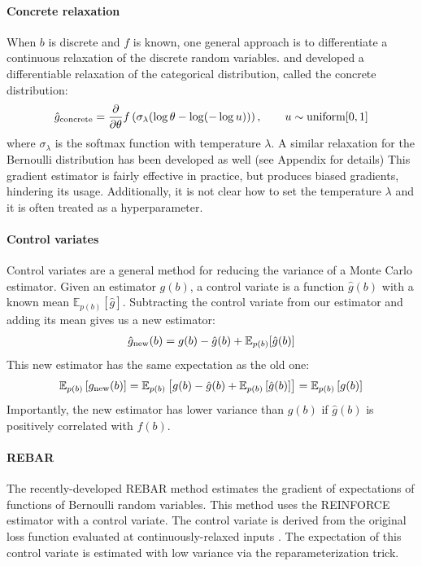 \documentclass{article}
\newcommand{\controlf}{\hat g}  %
\newcommand{\PT}{\frac{\partial}{\partial \theta}}
\begin{document}
\paragraph{Concrete relaxation}
When $b$ is discrete and $f$ is known, one general approach is to differentiate a continuous relaxation of the discrete random variables.
\cite{maddison2016concrete} and \cite{jang2016categorical} developed a differentiable relaxation of the categorical distribution, called the concrete distribution:
%
\begin{align}
\hat g_\textnormal{concrete} = \PT f \left( \sigma_\lambda ( \log \theta - \log(-\log u)) \right), \qquad u \sim \textnormal{uniform}[0, 1] 
\end{align}
%
where $\sigma_\lambda$ is the softmax function with temperature $\lambda$. A similar relaxation for the Bernoulli distribution has been developed as well (see Appendix for details)
This gradient estimator is fairly effective in practice, but produces biased gradients, hindering its usage.
Additionally, it is not clear how to set the temperature $\lambda$ and it is often treated as a hyperparameter.

\paragraph{Control variates}
Control variates are a general method for reducing the variance of a Monte Carlo estimator.
Given an estimator $g(b)$, a control variate is a function $\controlf(b)$ with a known mean $\mathbb{E}_{p(b)} [ \controlf ]$.
Subtracting the control variate from our estimator and adding its mean gives us a new estimator:
%
\begin{align}
\hat g_\textnormal{new}(b) = g(b) - \controlf(b) + \mathbb{E}_{p(b)}[\controlf(b)]
\end{align}
%
This new estimator has the same expectation as the old one:
%
\begin{align}
\mathbb{E}_{p(b)}\left[ g_\textnormal{new}(b) \right] 
= \mathbb{E}_{p(b)}\left[g(b) - \controlf(b) + \mathbb{E}_{p(b)} \left[ \controlf(b) \right] \right]
= \mathbb{E}_{p(b)}\left[ g(b) \right]
\end{align}
%
Importantly, the new estimator has lower variance than $g(b)$ if $\controlf(b)$ is positively correlated with $f(b)$.

\paragraph{REBAR}
The recently-developed REBAR method \citep{tucker2017rebar} estimates the gradient of expectations of functions of Bernoulli random variables. This method uses the REINFORCE estimator with a control variate. The control variate is derived from the original loss function evaluated at continuously-relaxed inputs \citep{maddison2016concrete, jang2016categorical}. The expectation of this control variate is estimated with low variance via the reparameterization trick. 
\end{document}
